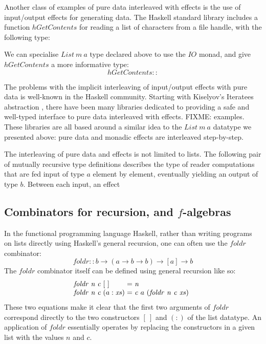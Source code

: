 Another class of examples of pure data interleaved with effects is the
use of input/output effects for generating data. The Haskell standard
library includes a function $\mathit{hGetContents}$ for reading a list
of characters from a file handle, with the following type:


We can specialise $\mathit{List}~m~a$ type declared above
to use the $\mathit{IO}$ monad, and give $\mathit{hGetContents}$ a
more informative type:
\begin{displaymath}
  \mathit{hGetContents} :: 
\end{displaymath}

The problems with the implicit interleaving of input/output effects
with pure data is well-known in the Haskell community. Starting with
Kiselyov's Iteratees abstraction \cite{kiselyov12iteratees}, there
have been many libraries dedicated to providing a safe and well-typed
interface to pure data interleaved with effects. FIXME:
examples. These libraries are all based around a similar idea to the
$\mathit{List}~m~a$ datatype we presented above: pure data and monadic
effects are interleaved step-by-step.

The interleaving of pure data and effects is not limited to lists. The
following pair of mutually recursive type definitions describes the
type of reader computations that are fed input of type $a$ element by
element, eventually yielding an output of type $b$. Between each input, an effect 


\subsection{Combinators for recursion, and $f$-algebras}

In the functional programming language Haskell, rather than writing
programs on lists directly using Haskell's general recursion, one can
often use the $\mathit{foldr}$ combinator:
\begin{displaymath}
  \mathit{foldr} :: b \to (a \to b \to b) \to [a] \to b
\end{displaymath}
The $\mathit{foldr}$ combinator itself can be defined using general
recursion like so:
\begin{displaymath}
  \begin{array}{@{}l@{\hspace{0.3em}}l@{\hspace{0.3em}}l@{\hspace{0.3em}}l@{\hspace{0.3em}}c@{\hspace{0.3em}}l}
    \mathit{foldr}&\mathit{n}&\mathit{c}&[~]& = & \mathit{n} \\
    \mathit{foldr}&\mathit{n}&\mathit{c}&(a:\mathit{xs}) & = & \mathit{c}~a~(\mathit{foldr}~\mathit{n}~\mathit{c}~\mathit{xs})
  \end{array}
\end{displaymath}
These two equations make it clear that the first two arguments of
$\mathit{foldr}$ correspond directly to the two constructors $[~]$ and
$(:)$ of the list datatype. An application of $\mathit{foldr}$
essentially operates by replacing the constructors in a given list
with the values $n$ and $c$.

